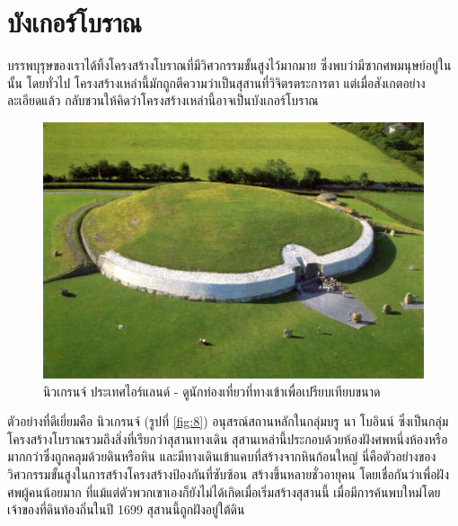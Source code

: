\documentclass[10pt,twocolumn,letterpaper]{article}
\begin{document}
\section{บังเกอร์โบราณ}

บรรพบุรุษของเราได้ทิ้งโครงสร้างโบราณที่มีวิศวกรรมขั้นสูงไว้มากมาย ซึ่งพบว่ามีซากศพมนุษย์อยู่ในนั้น โดยทั่วไป โครงสร้างเหล่านี้มักถูกตีความว่าเป็นสุสานที่วิจิตรตระการตา แต่เมื่อสังเกตอย่างละเอียดแล้ว กลับชวนให้คิดว่าโครงสร้างเหล่านี้อาจเป็นบังเกอร์โบราณ

\begin{figure}[b]
\begin{center}
   \includegraphics[width=1\linewidth]{ww19.jpg}
\end{center}
   \caption{นิวเกรนจ์ ประเทศไอร์แลนด์ - ดูนักท่องเที่ยวที่ทางเข้าเพื่อเปรียบเทียบขนาด}
\label{fig:8}
\label{fig:onecol}
\end{figure}

ตัวอย่างที่ดีเยี่ยมคือ นิวเกรนจ์ (รูปที่ \ref{fig:8}) อนุสรณ์สถานหลักในกลุ่มบรู นา โบอินน์ ซึ่งเป็นกลุ่มโครงสร้างโบราณรวมถึงสิ่งที่เรียกว่าสุสานทางเดิน สุสานเหล่านี้ประกอบด้วยห้องฝังศพหนึ่งห้องหรือมากกว่าซึ่งถูกคลุมด้วยดินหรือหิน และมีทางเดินเข้าแคบที่สร้างจากหินก้อนใหญ่ \cite{70} นี่คือตัวอย่างของวิศวกรรมขั้นสูงในการสร้างโครงสร้างป้องกันที่ซับซ้อน สร้างขึ้นหลายชั่วอายุคน โดยเชื่อกันว่าเพื่อฝังศพผู้คนน้อยมาก ที่แม้แต่ตัวพวกเขาเองก็ยังไม่ได้เกิดเมื่อเริ่มสร้างสุสานนี้ เมื่อมีการค้นพบใหม่โดยเจ้าของที่ดินท้องถิ่นในปี 1699 สุสานนี้ถูกฝังอยู่ใต้ดิน
\end{document}
